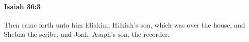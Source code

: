 
		\paragraph{Isaiah 36:3} %
			\label{ISAIAH-36-3}

			Then came forth unto him Eliakim, Hilkiah's son, which was over the house, and Shebna the scribe, and Joah, Asaph's son, the recorder.


